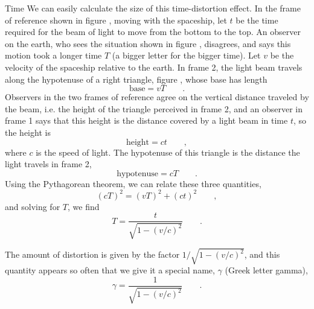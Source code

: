 \begin{envsubsection}{Time}
We can easily calculate the size of this time-distortion effect.
In the frame of reference shown in figure , moving
with the spaceship, let $t$ be the time required for the beam
of light to move from the bottom to the top. An observer on the
earth, who sees the situation shown in figure ,
disagrees, and says this motion took a longer time $T$ (a bigger
letter for the bigger time).
Let $v$ be the velocity of the spaceship relative to the earth.
In frame 2, the light beam travels along the hypotenuse of
a right triangle, figure , whose base has length
\begin{equation*}
	\text{base} = vT \qquad .
\end{equation*}
 Observers in the
two frames of reference agree on the vertical distance traveled by
the beam, i.e. the height of the triangle perceived in frame 2,
and an observer in frame 1 says that this height is the distance
covered by a light beam in time $t$, so the height is
\begin{equation*}
	\text{height} = ct \qquad ,
\end{equation*}
where $c$ is the speed of light.
The hypotenuse of this triangle is the distance the light travels
in frame 2,
\begin{equation*}
	\text{hypotenuse} = cT \qquad .
\end{equation*}
Using the Pythagorean theorem, we can relate these three quantities,
\begin{equation*}
	(cT)^2 = (vT)^2+(ct)^2 \qquad ,
\end{equation*}
and solving for $T$, we find
\begin{equation*}
	T =  \frac{t}{\sqrt{1-\left(v/c\right)^2}} \qquad .
\end{equation*}


The amount of distortion is given by the factor
$1/\sqrt{1-\left(v/c\right)^2}$, and this quantity appears so often that we
give it a special name, $\gamma$ (Greek letter gamma),
\begin{equation*}
	\gamma =  \frac{1}{\sqrt{1-\left(v/c\right)^2}}\qquad .
\end{equation*}

\end{envsubsection}


